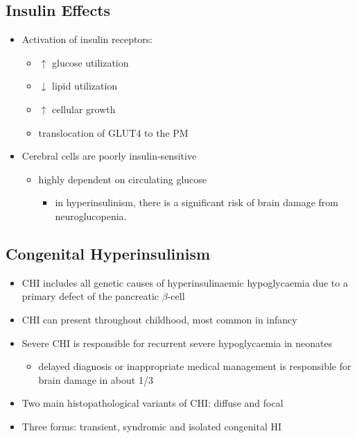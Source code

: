 \documentclass{scrartcl}
\begin{document}
\subsection{Insulin Effects}
\label{sec:org5b9f4db}
\begin{itemize}
\item Activation of insulin receptors:
\begin{itemize}
\item \(\uparrow\) glucose utilization
\item \(\downarrow\) lipid utilization
\item \(\uparrow\) cellular growth
\item translocation of GLUT4 to the PM
\end{itemize}
\item Cerebral cells are poorly insulin-sensitive
\begin{itemize}
\item highly dependent on circulating glucose
\begin{itemize}
\item in hyperinsulinism, there is a significant risk of brain damage
from neuroglucopenia.
\end{itemize}
\end{itemize}
\end{itemize}

\subsection{Congenital Hyperinsulinism}
\label{sec:orgcba67e6}
\begin{itemize}
\item CHI includes all genetic causes of hyperinsulinaemic
hypoglycaemia due to a primary defect of the pancreatic
\(\beta\)-cell
\item CHI can present throughout childhood, most common in infancy
\item Severe CHI is responsible for recurrent severe hypoglycaemia in neonates
\begin{itemize}
\item delayed diagnosis or inappropriate medical management is responsible for brain damage in about 1/3
\end{itemize}
\item Two main histopathological variants of CHI: diffuse and focal
\item Three forms: transient, syndromic and isolated congenital HI
\end{itemize}
\end{document}
